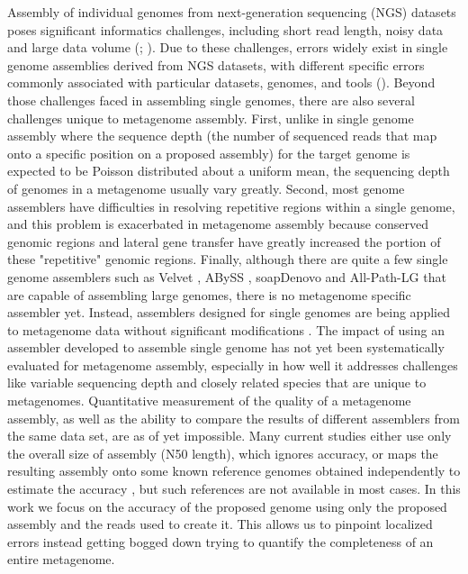 \documentclass[phd,tocprelim]{cornell}
\begin{document}
Assembly of individual genomes from next-generation sequencing (NGS) datasets poses significant informatics challenges, including short read length, noisy data and large data volume (\cite{Lin2011}; \cite{Pop2009}). Due to these challenges, errors widely exist in single genome assemblies derived from NGS datasets, with different specific errors commonly associated with particular datasets, genomes, and tools (\cite{Haiminen2011}). Beyond those challenges faced in assembling single genomes, there are also several challenges unique to metagenome assembly. First, unlike in single genome assembly where the sequence depth (the number of sequenced reads that map onto a specific position on a proposed assembly) for the target genome is expected to be Poisson distributed about a uniform mean, the sequencing depth of genomes in a metagenome usually vary greatly. Second, most genome assemblers have difficulties in resolving repetitive regions within a single genome, and this problem is exacerbated in metagenome assembly because conserved genomic regions and lateral gene transfer have greatly increased the portion of these "repetitive" genomic regions. Finally, although there are quite a few single genome assemblers such as Velvet \cite{Zerbino2008}, ABySS \cite{Simpson2009}, soapDenovo \cite{Li2010} and All-Path-LG \cite{Gnerre2010} that are capable of assembling large genomes, there is no metagenome specific assembler yet. Instead, assemblers designed for single genomes are being applied to metagenome data without significant modifications \cite{Qin2010}\cite{Hess2011}. The impact of using an assembler developed to assemble single genome has not yet been systematically evaluated for metagenome assembly, especially in how well it addresses challenges like variable sequencing depth and closely related species that are unique to metagenomes. Quantitative measurement of the quality of a metagenome assembly, as well as the ability to compare the results of different assemblers from the same data set, are as of yet impossible. Many current studies either use only the overall size of assembly (N50 length), which ignores accuracy, or maps the resulting assembly onto some known reference genomes obtained independently to estimate the accuracy \cite{Hess2011}, but such references are not available in most cases. In this work we focus on the accuracy of the proposed genome using only the proposed assembly and the reads used to create it. This allows us to pinpoint localized errors instead getting bogged down trying to quantify the completeness of an entire metagenome.
\end{document}
